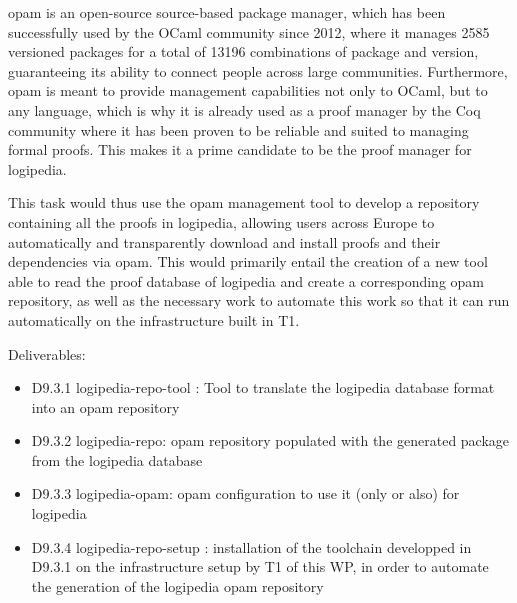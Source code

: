 \begin{workpackage}[id=access,wphases=0-48,type=MGT,
  short=Access,%
  title={Access to the infrastructure},
  lead=Inr,
  InrRM=28,
  OcaRM=6]
\begin{tasklist}
\begin{task}[id=opam,title=Giving access to the infrastructure in proof tools]
    opam \cite{opam} is an open-source source-based package manager, which has
    been successfully used by the OCaml community since 2012, where it manages
    2585 versioned packages for a total of 13196 combinations of package and
    version, guaranteeing its ability to connect people across large communities.
    Furthermore, opam is meant to provide management capabilities not only to
    OCaml, but to any language, which is why it is already used as a proof
    manager by the Coq community where it has been proven to be reliable and
    suited to managing formal proofs. This makes it a prime candidate to be the
    proof manager for logipedia.

    This task would thus use the opam management tool to develop a repository
    containing all the proofs in logipedia, allowing users across Europe to
    automatically and transparently download and install proofs and their
    dependencies via opam. This would primarily entail the creation of a new
    tool able to read the proof database of logipedia and create a corresponding
    opam repository, as well as the necessary work to automate this work so that
    it can run automatically on the infrastructure built in T1.

    Deliverables:
    \begin{itemize}
      \item D9.3.1 logipedia-repo-tool :
        Tool to translate the logipedia database format into an opam repository
      \item D9.3.2 logipedia-repo:
        opam repository populated with the generated package from the logipedia
        database
      \item D9.3.3 logipedia-opam:
        opam configuration to use it (only or also) for logipedia
      \item D9.3.4 logipedia-repo-setup :
        installation of the toolchain developped in D9.3.1 on the infrastructure
        setup by T1 of this WP, in order to automate the generation of
        the logipedia opam repository
    \end{itemize}

  \end{task}


\end{tasklist}
\end{workpackage}
